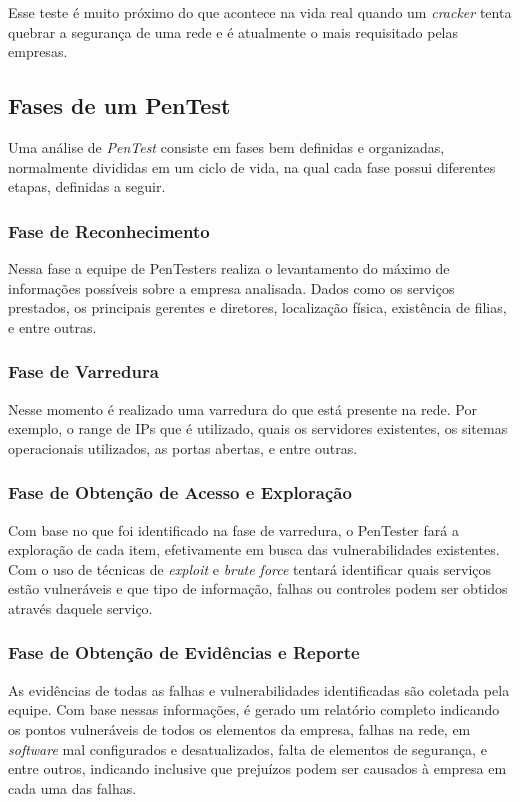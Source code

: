 Esse teste é muito próximo do que acontece na vida real quando um \textit{cracker} tenta quebrar a segurança de uma rede e é atualmente o mais requisitado pelas empresas. %

\subsection{Fases de um PenTest}
Uma análise de \textit{PenTest} consiste em fases bem definidas e organizadas, normalmente divididas em um ciclo de vida, na qual cada fase possui diferentes etapas, definidas a seguir.

\subsubsection{Fase de Reconhecimento}
Nessa fase a equipe de PenTesters realiza o levantamento do máximo de informações possíveis sobre a empresa analisada. Dados como os serviços prestados, os principais gerentes e diretores, localização física, existência de filias, e entre outras.

\subsubsection{Fase de Varredura}
Nesse momento é realizado uma varredura do que está presente na rede. Por exemplo, o range de IPs que é utilizado, quais os servidores existentes, os sitemas operacionais utilizados, as portas abertas, e entre outras.

\subsubsection{Fase de Obtenção de Acesso e Exploração}
Com base no que foi identificado na fase de varredura, o PenTester fará a exploração de cada item, efetivamente em busca das vulnerabilidades existentes. Com o uso de técnicas de \textit{exploit} e \textit{brute force} tentará identificar quais serviços estão vulneráveis e que tipo de informação, falhas ou controles podem ser obtidos através daquele serviço.

\subsubsection{Fase de Obtenção de Evidências e Reporte}
As evidências de todas as falhas e vulnerabilidades identificadas são coletada pela equipe. Com base nessas informações, é gerado um relatório completo indicando os pontos vulneráveis de todos os elementos da empresa, falhas na rede, em \textit{software} mal configurados e desatualizados, falta de elementos de segurança, e entre outros, indicando inclusive que prejuízos podem ser causados à empresa em cada uma das falhas.

